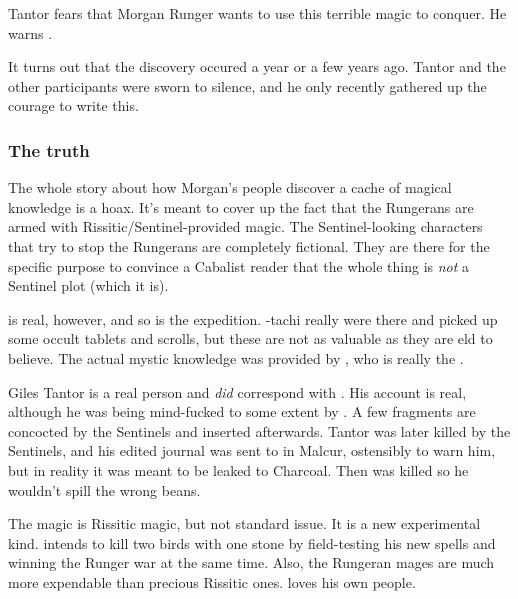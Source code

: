 \begin{garbage}
Tantor fears that Morgan Runger wants to use this terrible magic to conquer. He warns \Anatoli{}. 

It turns out that the discovery occured a year or a few years ago. Tantor and the other participants were sworn to silence, and he only recently gathered up the courage to write this. 






\subsubsection{The truth} 
The whole story about how Morgan's people discover a cache of magical knowledge is a hoax. It's meant to cover up the fact that the Rungerans are armed with Rissitic/Sentinel-provided magic. The Sentinel-looking characters that try to stop the Rungerans are completely fictional. They are there for the specific purpose to convince a Cabalist reader that the whole thing is \emph{not} a Sentinel plot (which it is). 

\Rungertemple{} is real, however, and so is the expedition. \Takestsha-tachi really were there and picked up some occult tablets and scrolls, but these are not as valuable as they are eld to believe. The actual mystic knowledge was provided by \Takestsha, who is really the \dragon{} \Nzessuacrith. 

Giles Tantor is a real person and \emph{did} correspond with \Anatoli{}. His account is real, although he was being mind-fucked to some extent by \Nzessuacrith. 
A few fragments are concocted by the Sentinels and inserted afterwards. Tantor was later killed by the Sentinels, and his edited journal was sent to \Anatoli{} in Malcur, ostensibly to warn him, but in reality it was meant to be leaked to Charcoal. 
Then \Anatoli{} was killed so he wouldn't spill the wrong beans. 

The \EreshKali{} magic is Rissitic magic, but not standard issue. 
It is a new experimental kind. 
\Secherdamon{} intends to kill two birds with one stone by field-testing his new spells and winning the Runger war at the same time. 
Also, the Rungeran mages are much more expendable than precious Rissitic ones. 
\Secherdamon{} loves his own people. 










\end{garbage}
